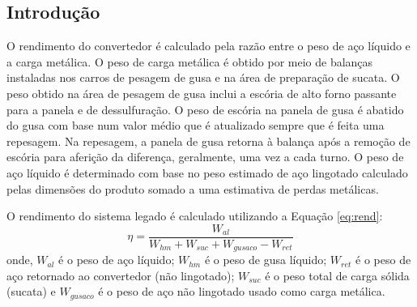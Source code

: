 \begin{multicols}{2}

	




\pagestyle{plain}
\setcounter{page}{1}
\section{Introdução}
	O rendimento do convertedor é calculado pela razão entre o peso de aço líquido e a carga metálica. O peso de carga metálica é obtido por meio de balanças instaladas nos carros de pesagem de gusa e na área de preparação de sucata. O peso obtido na área de pesagem de gusa inclui a escória de alto forno passante para a panela e de dessulfuração. O peso de escória na panela de gusa é abatido do gusa com base num valor médio que é atualizado sempre que é feita uma repesagem. Na repesagem, a panela de gusa retorna à balança após a remoção de escória para aferição da diferença, geralmente, uma vez a cada turno. O peso de aço líquido é determinado com base no peso estimado de aço lingotado calculado pelas dimensões do produto somado a uma estimativa de perdas metálicas.
	
	O rendimento do sistema legado é calculado utilizando a Equação \ref{eq:rend}:
	\begin{equation}
		\label{eq:rend}
		\eta = \frac{W_{al}}{W_{hm}+W_{suc}+W_{gusaco}-W_{ret}} %
	\end{equation}
	\noindent onde, $W_{al}$ é o peso de aço líquido; $W_{hm}$ é o peso de gusa líquido; $W_{ret}$ é o peso de aço retornado ao convertedor (não lingotado); $W_{suc}$ é o peso total de carga sólida (sucata) e $W_{gusaco}$ é o peso de aço não lingotado usado como carga metálica. 
	

\end{multicols}
